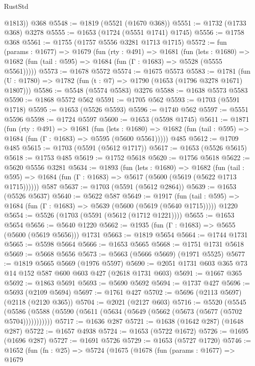 \begin{lexlean}{RustStd}
\begin{coremodule}
{\begin{coremodule}
{{{{{{{{{{{{{{{{        @1813))
    @368
@5548 := @1819 (@5521 (@1670 @368))
@5551 := @1732 (@1733 @368) @3278
@5555 := @1653 (@1724 (@5551 @1741) @1745)
@5556 := @1758 @368
@5561 := @1755 (@1757 @5556 @3281 @1713 @1715)
@5572 := fun (params : @1677) =>
  @1679
    (fun (rty : @491) =>
    @1681
      (fun (lets : @1680) =>
      @1682 (fun (tail : @595) => @1684 (fun (Γ : @1683) => @5528 (@5555 @5561)))))
@5573 := @1678 @5572
@5574 := @1675 @5573
@5583 := @1781 (fun (U : @1780) => @1782 (fun (t : @7) => @1790 (@1653 (@1796 @3278 @1671) @1807)))
@5586 := @5548 (@5574 @5583) @3276
@5588 := @1638 @5573 @5583
@5590 := @1868 @5572 @562
@5591 := @1705 @562
@5593 := @1703 (@5591 @1718)
@5595 := @1653 (@5526 @5593)
@5596 := @1740 @562
@5597 := @5551 @5596
@5598 := @1724 @5597
@5600 := @1653 (@5598 @1745)
@5611 := @1871
    (fun (rty : @491) =>
    @1681
      (fun (lets : @1680) =>
      @1682 (fun (tail : @595) => @1684 (fun (Γ : @1683) => @5595 (@5600 @5561)))))
    @485
@5612 := @1709 @485
@5615 := @1703 (@5591 (@5612 @1717))
@5617 := @1653 (@5526 @5615)
@5618 := @1753 @485
@5619 := @1752 @5618
@5620 := @1756 @5618
@5622 := @5620 @5556 @3281
@5634 := @1893
    (fun (lets : @1680) =>
    @1682
      (fun (tail : @595) => @1684 (fun (Γ : @1683) => @5617 (@5600 (@5619 (@5622 @1713 @1715))))))
    @587
@5637 := @1703 (@5591 (@5612 @2864))
@5639 := @1653 (@5526 @5637)
@5640 := @5622 @587
@5649 := @1917
    (fun (tail : @595) => @1684 (fun (Γ : @1683) => @5639 (@5600 (@5619 (@5640 @1715)))))
    @1220
@5654 := @5526 (@1703 (@5591 (@5612 (@1712 @1221))))
@5655 := @1653 @5654
@5656 := @5640 @1220
@5662 := @1935 (fun (Γ : @1683) => @5655 (@5600 (@5619 @5656))) @1731
@5663 := @1819 @5654
@5664 := @1744 @1731
@5665 := @5598 @5664
@5666 := @1653 @5665
@5668 := @1751 @1731 @5618
@5669 := @5668 @5656
@5673 := @5663 (@5666 @5669) (@1971 @5525)
@5677 := @1819 @5665 @5669 (@1976 @5597)
@5690 := @2051 @1731 @603 @365 @73 @14 @152 @587 @600 @603 @427 (@2618 @1731 @603)
@5691 := @1667 @365
@5692 := @1863 @5691
@5693 := @5690 @5692
@5694 := @1737 @427
@5696 := @5693 (@2109 @5694)
@5697 := @1761 @427
@5702 := @5696 (@2113 @5697) (@2118 (@2120 @365))
@5704 := @2021 (@2127 @603)
@5716 := @5520
    (@5545 (@5586 (@5588 (@5590 (@5611 (@5634 (@5649 (@5662 (@5673 (@5677 (@5702 @5704)))))))))))
@5717 := @1636 @287
@5721 := @1638 (@1642 @287) (@1648 @287)
@5722 := @1657 @4938
@5724 := @1653 (@5722 @1672)
@5726 := @1695 (@1696 @287)
@5727 := @1691 @5726
@5729 := @1653 (@5727 @1720)
@5746 := @1652
    (fun (fn : @25) =>
    @5724
      (@1675
        (@1678
          (fun (params : @1677) =>
          @1679
}}}}}}}}}}}}}}}}
\end{coremodule}}
\end{coremodule}
\end{lexlean}
